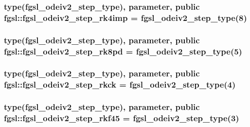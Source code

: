 \subsubsection[{fgsl\+\_\+odeiv2\+\_\+step\+\_\+rk4imp}]{\setlength{\rightskip}{0pt plus 5cm}type({\bf fgsl\+\_\+odeiv2\+\_\+step\+\_\+type}), parameter, public fgsl\+::fgsl\+\_\+odeiv2\+\_\+step\+\_\+rk4imp = {\bf fgsl\+\_\+odeiv2\+\_\+step\+\_\+type}(8)}\label{namespacefgsl_ac791c6691e1ebeae5e10c234a26737df}
\hypertarget{namespacefgsl_aa7c82f7503be3be3ab81991a3e8eb719}{}
\subsubsection[{fgsl\+\_\+odeiv2\+\_\+step\+\_\+rk8pd}]{\setlength{\rightskip}{0pt plus 5cm}type({\bf fgsl\+\_\+odeiv2\+\_\+step\+\_\+type}), parameter, public fgsl\+::fgsl\+\_\+odeiv2\+\_\+step\+\_\+rk8pd = {\bf fgsl\+\_\+odeiv2\+\_\+step\+\_\+type}(5)}\label{namespacefgsl_aa7c82f7503be3be3ab81991a3e8eb719}
\hypertarget{namespacefgsl_a18b4edbca94c0c9d60fbadc94d1d4964}{}
\subsubsection[{fgsl\+\_\+odeiv2\+\_\+step\+\_\+rkck}]{\setlength{\rightskip}{0pt plus 5cm}type({\bf fgsl\+\_\+odeiv2\+\_\+step\+\_\+type}), parameter, public fgsl\+::fgsl\+\_\+odeiv2\+\_\+step\+\_\+rkck = {\bf fgsl\+\_\+odeiv2\+\_\+step\+\_\+type}(4)}\label{namespacefgsl_a18b4edbca94c0c9d60fbadc94d1d4964}
\hypertarget{namespacefgsl_a9ddf77505b3bd58dea1832c7d57cb566}{}
\subsubsection[{fgsl\+\_\+odeiv2\+\_\+step\+\_\+rkf45}]{\setlength{\rightskip}{0pt plus 5cm}type({\bf fgsl\+\_\+odeiv2\+\_\+step\+\_\+type}), parameter, public fgsl\+::fgsl\+\_\+odeiv2\+\_\+step\+\_\+rkf45 = {\bf fgsl\+\_\+odeiv2\+\_\+step\+\_\+type}(3)}\label{namespacefgsl_a9ddf77505b3bd58dea1832c7d57cb566}
\hypertarget{namespacefgsl_a2325b2b4a96fc162d6be916e21d71bb0}{}
